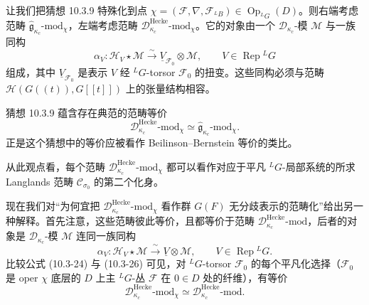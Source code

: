 让我们把猜想 10.3.9 特殊化到点 $\chi=(\mathcal{F},\nabla,\mathcal{F}_{{}^LB})\in\operatorname{Op}_{{}^LG}(D)$。则右端考虑范畴 $\hat{\mathfrak{g}}_{\kappa_c}\text{-mod}_\chi$，左端考虑范畴 $\mathcal{D}^{\text{Hecke}}_{\kappa_c}\text{-mod}_\chi$。它的对象由一个 $\mathcal{D}_{\kappa_c}$-模 $\mathcal{M}$ 与一族同构
\begin{equation}
    \alpha_V:\mathcal{H}_V\star\mathcal{M}\xrightarrow{\ \sim\ }
    \underline{V}_{\mathcal{F}_0}\otimes\mathcal{M},
    \qquad V\in\operatorname{Rep}{}^LG
    \tag{10.3-24}
\end{equation}
组成，其中 $\underline{V}_{\mathcal{F}_0}$ 是表示 $V$ 经 ${}^LG$-torsor $\mathcal{F}_0$ 的扭变。这些同构必须与范畴 $\mathcal{H}(G((t)),G[[t]])$ 上的张量结构相容。

猜想 10.3.9 蕴含存在典范的范畴等价
\begin{equation}
    \mathcal{D}^{\text{Hecke}}_{\kappa_c}\text{-mod}_\chi
    \simeq\hat{\mathfrak{g}}_{\kappa_c}\text{-mod}_\chi.
    \tag{10.3-25}
\end{equation}
正是这个猜想中的等价应被看作 Beilinson--Bernstein 等价的类比。

从此观点看，每个范畴 $\mathcal{D}^{\text{Hecke}}_{\kappa_c}\text{-mod}_\chi$ 都可以看作对应于平凡 ${}^LG$-局部系统的所求 Langlands 范畴 $\mathcal{C}_{\sigma_0}$ 的第二个化身。

现在我们对“为何宜把 $\mathcal{D}^{\text{Hecke}}_{\kappa_c}\text{-mod}_\chi$ 看作群 $G(F)$ 无分歧表示的范畴化”给出另一种解释。首先注意，这些范畴彼此等价，且都等价于范畴 $\mathcal{D}^{\text{Hecke}}_{\kappa_c}\text{-mod}$，后者的对象是 $\mathcal{D}_{\kappa_c}$-模 $\mathcal{M}$ 连同一族同构
\begin{equation}
    \alpha_V:\mathcal{H}_V\star\mathcal{M}\xrightarrow{\ \sim\ }
    \underline{V}\otimes\mathcal{M},
    \qquad V\in\operatorname{Rep}{}^LG.
    \tag{10.3-26}
\end{equation}
比较公式 (10.3-24) 与 (10.3-26) 可见，对 ${}^LG$-torsor $\mathcal{F}_0$ 的每个平凡化选择（$\mathcal{F}_0$ 是 oper $\chi$ 底层的 $D$ 上主 ${}^LG$-丛 $\mathcal{F}$ 在 $0\in D$ 处的纤维），有等价
\[
    \mathcal{D}^{\text{Hecke}}_{\kappa_c}\text{-mod}_\chi
    \simeq\mathcal{D}^{\text{Hecke}}_{\kappa_c}\text{-mod}.
\]

